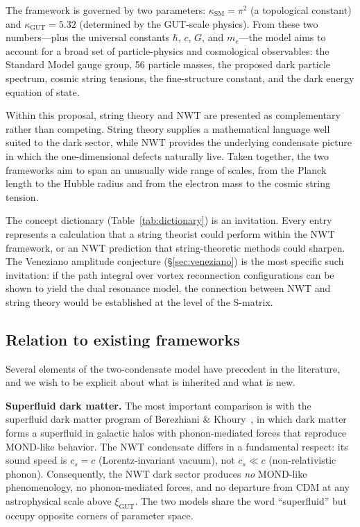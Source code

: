 \documentclass[11pt]{article}
\begin{document}
The framework is governed by two parameters: $\kappa_\text{SM} = \pi^2$ (a topological constant) and $\kappa_\text{GUT} = 5.32$ (determined by the GUT-scale physics).
From these two numbers---plus the universal constants $\hbar$, $c$, $G$, and $m_e$---the model aims to account for a broad set of particle-physics and cosmological observables: the Standard Model gauge group, 56 particle masses, the proposed dark particle spectrum, cosmic string tensions, the fine-structure constant, and the dark energy equation of state.

Within this proposal, string theory and NWT are presented as complementary rather than competing.
String theory supplies a mathematical language well suited to the dark sector, while NWT provides the underlying condensate picture in which the one-dimensional defects naturally live.
Taken together, the two frameworks aim to span an unusually wide range of scales, from the Planck length to the Hubble radius and from the electron mass to the cosmic string tension.

The concept dictionary (Table~\ref{tab:dictionary}) is an invitation.
Every entry represents a calculation that a string theorist could perform within the NWT framework, or an NWT prediction that string-theoretic methods could sharpen.
The Veneziano amplitude conjecture (\S\ref{sec:veneziano}) is the most specific such invitation: if the path integral over vortex reconnection configurations can be shown to yield the dual resonance model, the connection between NWT and string theory would be established at the level of the S-matrix.

\subsection{Relation to existing frameworks}

Several elements of the two-condensate model have precedent in the literature, and we wish to be explicit about what is inherited and what is new.

\textbf{Superfluid dark matter.}
The most important comparison is with the superfluid dark matter program of Berezhiani \& Khoury~\cite{BerezhianiKhoury2015}, in which dark matter forms a superfluid in galactic halos with phonon-mediated forces that reproduce MOND-like behavior.
The NWT condensate differs in a fundamental respect: its sound speed is $c_s = c$ (Lorentz-invariant vacuum), not $c_s \ll c$ (non-relativistic phonon).
Consequently, the NWT dark sector produces \emph{no} MOND-like phenomenology, no phonon-mediated forces, and no departure from CDM at any astrophysical scale above $\xi_\text{GUT}$.
The two models share the word ``superfluid'' but occupy opposite corners of parameter space.
\end{document}
